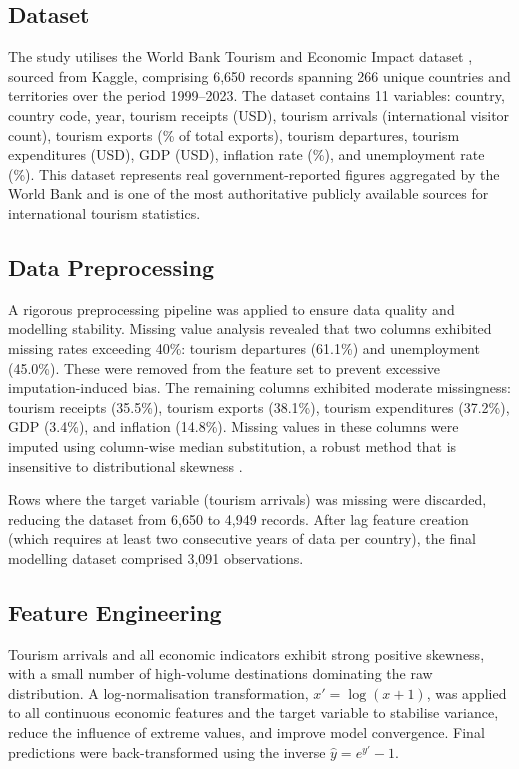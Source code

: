 \documentclass[conference]{IEEEtran}
\begin{document}
\subsection{Dataset}

The study utilises the World Bank Tourism and Economic
Impact dataset \cite{worldbank2024}, sourced from Kaggle,
comprising 6,650 records spanning 266 unique countries and
territories over the period 1999--2023. The dataset contains
11 variables: country, country code, year, tourism receipts
(USD), tourism arrivals (international visitor count),
tourism exports (\% of total exports), tourism departures,
tourism expenditures (USD), GDP (USD), inflation rate (\%),
and unemployment rate (\%). This dataset represents real
government-reported figures aggregated by the World Bank
and is one of the most authoritative publicly available
sources for international tourism statistics.

\subsection{Data Preprocessing}

A rigorous preprocessing pipeline was applied to ensure
data quality and modelling stability. Missing value analysis
revealed that two columns exhibited missing rates exceeding
40\%: tourism departures (61.1\%) and unemployment (45.0\%).
These were removed from the feature set to prevent
excessive imputation-induced bias. The remaining columns
exhibited moderate missingness: tourism receipts (35.5\%),
tourism exports (38.1\%), tourism expenditures (37.2\%),
GDP (3.4\%), and inflation (14.8\%). Missing values in
these columns were imputed using column-wise median
substitution, a robust method that is insensitive to
distributional skewness \cite{li2018}.

Rows where the target variable (tourism arrivals) was
missing were discarded, reducing the dataset from 6,650 to
4,949 records. After lag feature creation (which requires
at least two consecutive years of data per country), the
final modelling dataset comprised 3,091 observations.

\subsection{Feature Engineering}

Tourism arrivals and all economic indicators exhibit strong
positive skewness, with a small number of high-volume
destinations dominating the raw distribution. A
log-normalisation transformation, $x' = \log(x + 1)$, was
applied to all continuous economic features and the target
variable to stabilise variance, reduce the influence of
extreme values, and improve model convergence. Final
predictions were back-transformed using the inverse
$\hat{y} = e^{y'} - 1$.
\end{document}
